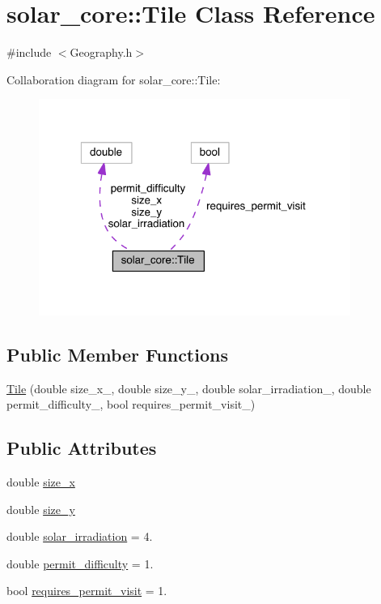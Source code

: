 \hypertarget{classsolar__core_1_1_tile}{}\section{solar\+\_\+core\+:\+:Tile Class Reference}
\label{classsolar__core_1_1_tile}


{\ttfamily \#include $<$Geography.\+h$>$}



Collaboration diagram for solar\+\_\+core\+:\+:Tile\+:
\nopagebreak
\begin{figure}[H]
\begin{center}
\leavevmode
\includegraphics[width=289pt]{classsolar__core_1_1_tile__coll__graph}
\end{center}
\end{figure}
\subsection*{Public Member Functions}
\begin{DoxyCompactItemize}
\item 
\hyperlink{classsolar__core_1_1_tile_ac0304f116ac4ab3d130e7dc4233f12e2}{Tile} (double size\+\_\+x\+\_\+, double size\+\_\+y\+\_\+, double solar\+\_\+irradiation\+\_\+, double permit\+\_\+difficulty\+\_\+, bool requires\+\_\+permit\+\_\+visit\+\_\+)
\end{DoxyCompactItemize}
\subsection*{Public Attributes}
\begin{DoxyCompactItemize}
\item 
double \hyperlink{classsolar__core_1_1_tile_ae8615b87d6d0c614de01b497fa63c27b}{size\+\_\+x}
\item 
double \hyperlink{classsolar__core_1_1_tile_a698ac57539f58ed4e0a54b3135be6fb9}{size\+\_\+y}
\item 
double \hyperlink{classsolar__core_1_1_tile_a2062d4ffe05c6f6282975f71f2d24441}{solar\+\_\+irradiation} = 4.
\item 
double \hyperlink{classsolar__core_1_1_tile_ac4cdbb55f06b95bd8c4a11a25d0b6635}{permit\+\_\+difficulty} = 1.
\item 
bool \hyperlink{classsolar__core_1_1_tile_a489ba61bbe83f143b98d8a866cf06f13}{requires\+\_\+permit\+\_\+visit} = 1.
\end{DoxyCompactItemize}


